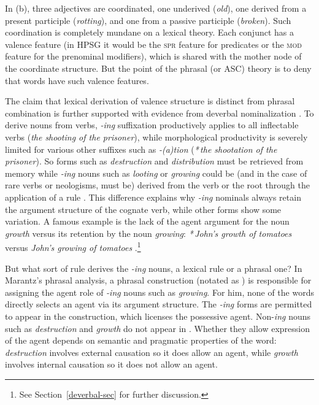 \noindent
In (b), three adjectives are coordinated, one underived (\emph{old}), one derived from a
present participle (\emph{rotting}), and one from a passive participle (\emph{broken}).  Such
coordination is completely mundane on a lexical theory.  Each \azero conjunct has a valence feature
(in HPSG it would be the \textsc{spr} feature for predicates or the \textsc{mod} feature for the prenominal
modifiers), which is shared with the mother node of the coordinate structure.  But the point of the
phrasal (or ASC) theory is to deny that words have such valence features.   

The claim that lexical derivation of valence structure is distinct from phrasal combination is
further supported with evidence from deverbal nominalization \citep{Wechsler2008a}.  To derive nouns
from verbs, \emph{-ing} suffixation productively applies to all inflectable verbs (\emph{the shooting
  of the prisoner}), while morphological productivity is severely limited for various other suffixes
such as \emph{-(a)tion} (\emph{*\,the shootation of the prisoner}).  So forms such as \emph{destruction}
and \emph{distribution} must be retrieved from memory while \emph{-ing} nouns such as \emph{looting} or
\emph{growing} could be (and in the case of rare verbs or neologisms, must be) derived from the verb
or the root through the application of a rule \citep{Zucchi93a-u}.  
This difference explains why \emph{-ing} nominals always retain the argument structure of the cognate verb, while other forms show
some variation.  A famous example is the lack of the agent argument for the noun \emph{growth} versus
its retention by the noun \emph{growing}: \emph{*\,John's growth of tomatoes} versus \emph{John's growing
  of tomatoes} \citep{Chomsky70a}.\footnote{See Section~\ref{deverbal-sec} for further discussion.} 
  
But what sort of rule derives the \emph{-ing} nouns, a lexical rule or a phrasal one?  
In Marantz's \citeyearpar{Marantz97a} phrasal analysis,  a phrasal
construction (notated as \vP) is responsible for assigning the agent role 
of  \emph{-ing} nouns such as \emph{growing}.  For him, none of the words directly selects an agent via its argument structure.
The \emph{-ing} forms are
permitted to appear in the \vP construction, which licenses the possessive agent.  
Non-\emph{ing} nouns such as \emph{destruction} and  \emph{growth} do not appear in \vP.  Whether they allow
expression of the agent depends on semantic and pragmatic properties of the word: \emph{destruction} involves external 
causation so it does allow an agent, while \emph{growth} involves internal causation so it does not allow an agent.

